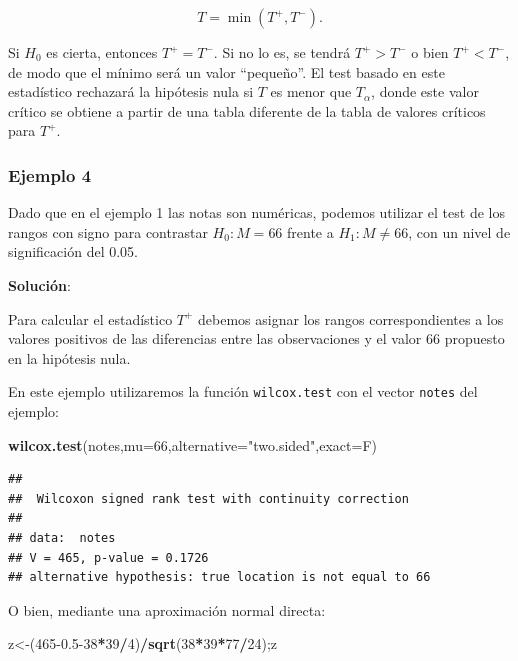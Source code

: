 \documentclass[
]{article}
\newenvironment{Shaded}{\begin{snugshade}}{\end{snugshade}}
\newcommand{\AttributeTok}[1]{\textcolor[rgb]{0.13,0.29,0.53}{#1}}
\newcommand{\DecValTok}[1]{\textcolor[rgb]{0.00,0.00,0.81}{#1}}
\newcommand{\FloatTok}[1]{\textcolor[rgb]{0.00,0.00,0.81}{#1}}
\newcommand{\FunctionTok}[1]{\textcolor[rgb]{0.13,0.29,0.53}{\textbf{#1}}}
\newcommand{\NormalTok}[1]{#1}
\newcommand{\OtherTok}[1]{\textcolor[rgb]{0.56,0.35,0.01}{#1}}
\newcommand{\SpecialCharTok}[1]{\textcolor[rgb]{0.81,0.36,0.00}{\textbf{#1}}}
\newcommand{\StringTok}[1]{\textcolor[rgb]{0.31,0.60,0.02}{#1}}
\begin{document}
\[
T=\min \left(T^{+}, T^{-}\right) .
\]

Si \(H_{0}\) es cierta, entonces \(T^{+}=T^{-}\). Si no lo es, se tendrá \(T^{+}>T^{-}\) o bien \(T^{+}<T^{-}\), de modo que el mínimo será un valor ``pequeño''. El test basado en este estadístico rechazará la hipótesis nula si \(T\) es menor que \(T_{\alpha}\), donde este valor crítico se obtiene a partir de una tabla diferente de la tabla de valores críticos para \(T^{+}\).

\subsubsection{Ejemplo 4}\label{ejemplo-4-1}

Dado que en el ejemplo 1 las notas son numéricas, podemos utilizar el test de los rangos con signo para contrastar \(H_{0}: M=66\) frente a \(H_{1}: M \neq 66\), con un nivel de significación del 0.05.

\textbf{Solución}:

Para calcular el estadístico \(T^{+}\) debemos asignar los rangos correspondientes a los valores positivos de las diferencias entre las observaciones y el valor 66 propuesto en la hipótesis nula.

En este ejemplo utilizaremos la función \texttt{wilcox.test} con el vector \texttt{notes} del ejemplo:

\begin{Shaded}
\begin{Highlighting}[]
\FunctionTok{wilcox.test}\NormalTok{(notes,}\AttributeTok{mu=}\DecValTok{66}\NormalTok{,}\AttributeTok{alternative=}\StringTok{"two.sided"}\NormalTok{,}\AttributeTok{exact=}\NormalTok{F)}
\end{Highlighting}
\end{Shaded}

\begin{verbatim}
## 
##  Wilcoxon signed rank test with continuity correction
## 
## data:  notes
## V = 465, p-value = 0.1726
## alternative hypothesis: true location is not equal to 66
\end{verbatim}

O bien, mediante una aproximación normal directa:

\begin{Shaded}
\begin{Highlighting}[]
\NormalTok{z}\OtherTok{\textless{}{-}}\NormalTok{(}\DecValTok{465}\FloatTok{{-}0.5}\DecValTok{{-}38}\SpecialCharTok{*}\DecValTok{39}\SpecialCharTok{/}\DecValTok{4}\NormalTok{)}\SpecialCharTok{/}\FunctionTok{sqrt}\NormalTok{(}\DecValTok{38}\SpecialCharTok{*}\DecValTok{39}\SpecialCharTok{*}\DecValTok{77}\SpecialCharTok{/}\DecValTok{24}\NormalTok{);z}
\end{Highlighting}
\end{Shaded}
\end{document}
